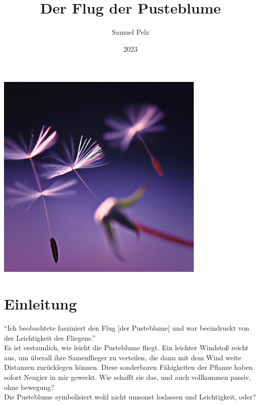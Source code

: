 \documentclass[a4paper, 12pt, final]{article} %
\title{Der Flug der Pusteblume}
\author{Samuel Pelz}
\date{2023}
\begin{document}
    
    \newpage


    \maketitle%
    \vspace{3cm}
    \begin{center}
        \includegraphics[width=0.75\textwidth]{pusteblume_5}
    \end{center}
    \newpage


    \tableofcontents%
    \listoffigures
    \newpage


    \section{Einleitung}\label{sec:einleitung}%

    \enquote{Ich beobachtete fasziniert den Flug [der Pusteblume] und war beeindruckt von der Leichtigkeit des Fliegens.}\\
    Es ist erstaunlich, wie leicht die Pusteblume fliegt.
    Ein leichter Windstoß reicht aus, um überall ihre Samenflieger zu verteilen,
    die dann mit dem Wind weite Distanzen zurücklegen können.
    Diese sonderbaren Fähigkeiten der Pflanze haben sofort Neugier in mir geweckt.
    Wie schafft sie das, und auch vollkommen passiv, ohne bewegung?\\
    Die Pusteblume symbolisiert wohl nicht umsonst loslassen und Leichtigkeit, oder?
    \newpage
\end{document}
